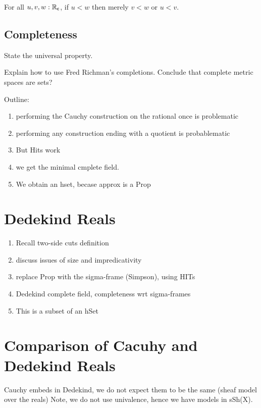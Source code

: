 \begin{lem} \label{RC-le-linear}
  For all $u, v, w : \mathbb{R}_\mathsf{c}$, if $u < w$ then merely $v < w$ or $u < v$.
\end{lem}



\subsection{Completeness}
\label{sec:completeness}

State the universal property.

Explain how to use Fred Richman's completions. Conclude that complete metric spaces are sets?




\hrulefill

Outline:
\begin{enumerate}
  \item performing the Cauchy construction on the rational once is problematic
  \item performing any construction ending with a quotient is probablematic
  \item But Hits work
  \item we get the minimal cmplete field.
  \item We obtain an hset, becase approx is a Prop
\end{enumerate}

\section{Dedekind Reals}
\label{sec:dedekind-reals}

\begin{enumerate}
\item Recall two-side cuts definition
\item discuss issues of size and impredicativity
\item replace Prop with the sigma-frame (Simpson), using HITs
\item Dedekind complete field, completeness wrt sigma-frames
\item This is a subset of an hSet
\end{enumerate}

\section{Comparison of Cacuhy and Dedekind Reals}
\label{sec:comp-cacuhy-dedek}

Cauchy embeds in Dedekind, we do not expect them to be the same (sheaf model over the
reals) Note, we do not use univalence, hence we have models in sSh(X).

